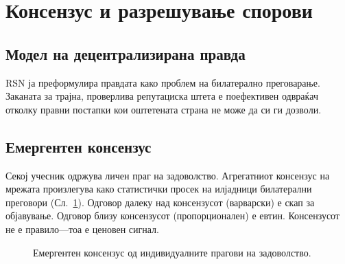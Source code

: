 \documentclass[11pt,a4paper,twocolumn]{article}
\begin{document}
\section{Консензус и разрешување спорови}

\subsection{Модел на децентрализирана правда}

RSN ја преформулира правдата како проблем на билатерално преговарање. Заканата за трајна, проверлива репутациска штета е поефективен одвраќач отколку правни постапки кои оштетената страна не може да си ги дозволи.

\subsection{Емергентен консензус}

Секој учесник одржува личен праг на задоволство. Агрегатниот консензус на мрежата произлегува како статистички просек на илјадници билатерални преговори (Сл.~\ref{fig:consensus}). Одговор далеку над консензусот (варварски) е скап за објавување. Одговор близу консензусот (пропорционален) е евтин. Консензусот не е правило---тоа е ценовен сигнал.

\begin{figure}[ht]
\centering
{}
\caption{Емергентен консензус од индивидуалните прагови на задоволство.}
\label{fig:consensus}
\end{figure}
\end{document}
